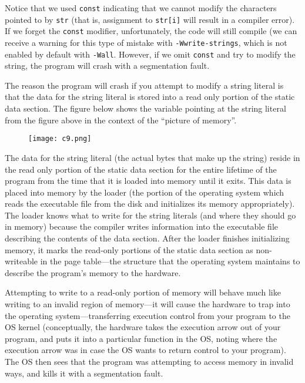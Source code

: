 \documentclass[12pt,a4paper]{article}
\begin{document}
Notice that we used \verb|const| indicating that we cannot modify the
characters pointed to by \verb|str| (that is, assignment to \verb|str[i]| will
result in a compiler error). If we forget the \verb|const| modifier,
unfortunately, the code will still compile (we can receive a warning for this
type of mistake with \verb|-Wwrite-strings|, which is not enabled by default
with \verb|-Wall|. However, if we omit \verb|const| and try to modify the
string, the program will crash with a segmentation fault.

The reason the program will crash if you attempt to modify a string literal is
that the data for the string literal is stored into a read only portion of the
static data section. The figure below shows the variable pointing at the string
literal from the figure above in the context of the “picture of memory”. 

\begin{figure}[!htbp]
	\centering
	\texttt{[image: c9.png]}
\end{figure}

The data for the string literal (the actual bytes that make up the string)
reside in the read only portion of the static data section for the entire
lifetime of the program from the time that it is loaded into memory until it
exits. This data is placed into memory by the loader (the portion of the
operating system which reads the executable file from the disk and initializes
its memory appropriately). The loader knows what to write for the string
literals (and where they should go in memory) because the compiler writes
information into the executable file describing the contents of the data
section. After the loader finishes initializing memory, it marks the read-only
portions of the static data section as non-writeable in the page table—the
structure that the operating system maintains to describe the program’s memory
to the hardware.

Attempting to write to a read-only portion of memory will behave much like
writing to an invalid region of memory—it will cause the hardware to trap into
the operating system—transferring execution control from your program to the OS
kernel (conceptually, the hardware takes the execution arrow out of your
program, and puts it into a particular function in the OS, noting where the
execution arrow was in case the OS wants to return control to your program).
The OS then sees that the program was attempting to access memory in invalid
ways, and kills it with a segmentation fault.
\end{document}
